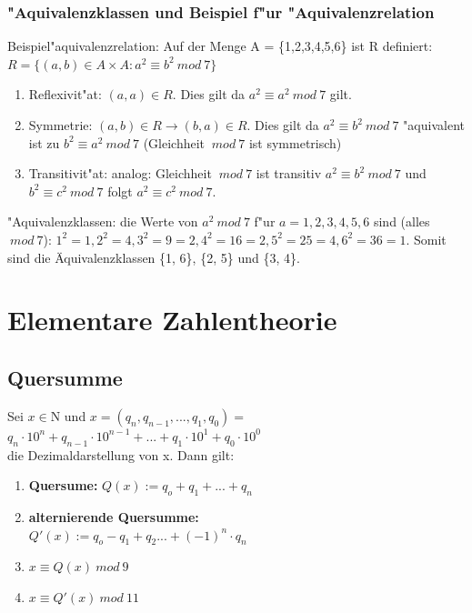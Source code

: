 \documentclass[10pt,a4paper,landscape]{article}
\begin{document}
\begin{multicols*}{3}
		\subsubsection{"Aquivalenzklassen und Beispiel f"ur "Aquivalenzrelation}
		Beispiel"aquivalenzrelation: Auf der Menge A = \{1,2,3,4,5,6\} ist R definiert: $R = \{(a,b) \in A \times A:a^2 \equiv b^2~mod~7\}$
		\begin{enumerate}
			\item Reflexivit"at: $(a, a) \in R.$ Dies gilt da $a^2 \equiv a^2 ~mod~ 7$ gilt.
			\item Symmetrie: $(a, b) \in R \rightarrow (b, a) \in R$. Dies gilt da $a^2 \equiv b^2 ~mod~ 7$ "aquivalent ist zu $b^2 \equiv a^2 ~mod~ 7$ (Gleichheit $~mod~ 7$ ist symmetrisch)
			\item Transitivit"at: analog: Gleichheit $~mod~ 7$ ist transitiv $a^2 \equiv b^2 ~mod~ 7$ und $b^2 \equiv c^2 ~mod~ 7$ folgt $a^2 \equiv c^2 ~mod~ 7$.
		\end{enumerate}
		"Aquivalenzklassen: die Werte von $a^2 ~mod~ 7$ f"ur $a = 1, 2, 3, 4, 5, 6$ sind (alles $~mod~7$):
		$1^2 = 1, 2^2 = 4, 3^2 = 9 = 2, 4^2 = 16 = 2, 5^2 = 25 = 4, 6^2 = 36 = 1$.
		Somit sind die Äquivalenzklassen \{1, 6\}, \{2, 5\} und \{3, 4\}.
		
		\section{Elementare Zahlentheorie}
		\subsection{Quersumme}
		Sei $x \in \mathrm{N}$ und $x = (q_n, q_{n-1}, ... , q_1, q_0 ) =$\\
		$ q_n \cdot 10^n + q_{n-1} \cdot 10^{n-1} + ... + q_1 \cdot 10^1 + q_0 \cdot 10^0$\\ die Dezimaldarstellung von x. Dann gilt:
		
		\begin{enumerate}
			\item \textbf{Quersume:} $Q(x) := q_o + q_1 + ... + q_n$
			\item \textbf{alternierende Quersumme:}\\ $Q'(x) := q_o - q_1 + q_2 ... + (-1)^n \cdot q_n$
			\item $x \equiv Q(x)~mod~9$
			\item $x \equiv Q'(x)~mod~11$
		\end{enumerate}
		

\end{multicols*}
\end{document}
